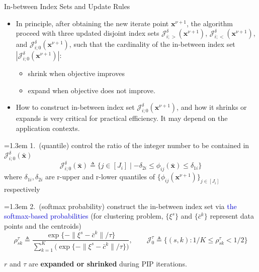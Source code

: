 \documentclass[aspectratio=169,xcolor=dvipsnames]{beamer}
\begin{document}
\begin{frame}{In-between Index Sets and Update Rules}
  \footnotesize
  \setlength{\abovedisplayskip}{3pt}
  \setlength{\belowdisplayskip}{3pt}

  \begin{itemize}
    \setlength{\itemsep}{0.05cm}
    \item In principle, after obtaining the new iterate point
      $\mathbf{x}^{\nu+1}$, the algorithm proceed with three updated disjoint
      index sets $\mathcal{J}^\delta_{i;>}(\mathbf{x}^{\nu+1})$,
      $\mathcal{J}^\delta_{i;<}(\mathbf{x}^{\nu+1})$, and
      $\mathcal{J}^\delta_{i;0}(\mathbf{x}^{\nu+1})$, such that the cardinality
      of the in-between index set
      $|\mathcal{J}^\delta_{i;0}(\mathbf{x}^{\nu+1})|$:
      \begin{itemize}
        \setlength{\itemsep}{0cm}
        \item[--] shrink when objective improves
        \item[--] expand when objective does not improve.
      \end{itemize}
    \item How to construct in-between index set
      $\mathcal{J}^\delta_{i;0}(\mathbf{x}^{\nu+1})$, and how it shrinks or
      expands is very critical for practical efficiency. It may depend on the
      application contexts.
  \end{itemize}

  \smallskip
  \hangindent=1.3em
  1.~(quantile) control the ratio of the integer number to be contained in
  $\mathcal{J}^\delta_{i;0}(\bar{\mathbf{x}})$
  \[
    \mathcal{J}^\delta_{i;0}(\bar{\mathbf{x}})\triangleq
    \bigl\{j\in[J_i]\mid -\delta_{2i}\leq\phi_{ij}(\bar{\mathbf{x}})\leq
    \delta_{1i}\bigr\}
  \]
  where $\delta_{1i},\delta_{2i}$ are r-upper and r-lower quantiles of
  $\{\phi_{ij}(\mathbf{x}^{\nu+1})\}_{j\in[J_i]}$ respectively

  \smallskip
  \hangindent=1.3em
  2.~(softmax probability) construct the in-between index set via
  \textcolor{MediumBlue}{the softmax-based probabilities} (for clustering
  problem, $\{\xi^s\}$ and $\{\bar{c}^k\}$ represent data points and the
  centroids)
  \[
    \rho^\tau_{sk}\triangleq
    \frac{\exp\{-\|\xi^s-\bar{c}^k\|/\tau\}}
         {\sum_{k=1}^{K}\bigl(\exp\{-\|\xi^s-\bar{c}^k\|/\tau\}\bigr)},
    \qquad
    \mathcal{J}^\tau_0\triangleq
    \bigl\{(s,k):1/K\leq\rho^\tau_{sk}<1/2\bigr\}
  \]

  \smallskip
  $r$ and $\tau$ are \textbf{expanded or shrinked} during PIP iterations.
\end{frame}
\end{document}
